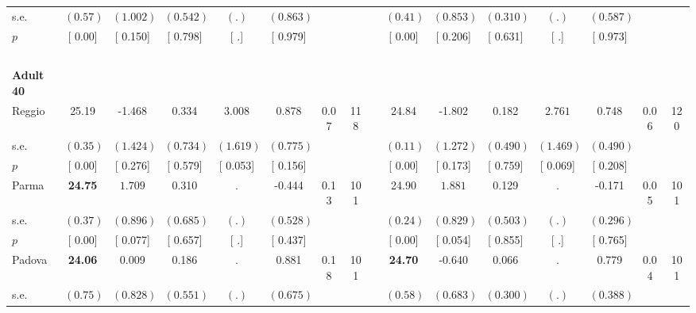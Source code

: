 \begin{longtable}{L{8em} c c c c c c c p{1em} c c c c c c c}
\quad \quad \quad \quad s.e.& $ (     0.57)$ & $ (    1.002)$ & $ (    0.542)$ & $ (        .)$ & $ (    0.863)$ & & & & $ (     0.41)$ & $ (    0.853)$ & $ (    0.310)$ & $ (        .)$ & $ (    0.587)$ & &  \\*
\quad \quad \quad \quad $ p$ & [     0.00] & [    0.150] & [    0.798] & [        .] & [    0.979] & & & & [     0.00] & [    0.206] & [    0.631] & [        .] & [    0.973] & &  \\[1em]
~\\[1em]
\quad \quad \textbf{Adult 40} & & & & & & & & & & & & & & & \\* 
\quad \quad \quad Reggio& 25.19 &    -1.468 &     0.334 & $ \mathbf{    3.008}$ &     0.878 &      0.07 &       118 & & 24.84 &    -1.802 &     0.182 & $ \mathbf{    2.761}$ &     0.748 &      0.06 &       120  \\*
\quad \quad \quad \quad s.e.& $ (     0.35)$ & $ (    1.424)$ & $ (    0.734)$ & $ (    1.619)$ & $ (    0.775)$ & & & & $ (     0.11)$ & $ (    1.272)$ & $ (    0.490)$ & $ (    1.469)$ & $ (    0.490)$ & &  \\*
\quad \quad \quad \quad $ p$ & [     0.00] & [    0.276] & [    0.579] & [    0.053] & [    0.156] & & & & [     0.00] & [    0.173] & [    0.759] & [    0.069] & [    0.208] & &  \\[1em]
\quad \quad \quad Parma& \textbf{    24.75} & $ \mathbf{    1.709}$ &     0.310 &         . &    -0.444 &      0.13 &       101 & & 24.90 & $ \mathbf{    1.881}$ &     0.129 &         . &    -0.171 &      0.05 &       101  \\*
\quad \quad \quad \quad s.e.& $ (     0.37)$ & $ (    0.896)$ & $ (    0.685)$ & $ (        .)$ & $ (    0.528)$ & & & & $ (     0.24)$ & $ (    0.829)$ & $ (    0.503)$ & $ (        .)$ & $ (    0.296)$ & &  \\*
\quad \quad \quad \quad $ p$ & [     0.00] & [    0.077] & [    0.657] & [        .] & [    0.437] & & & & [     0.00] & [    0.054] & [    0.855] & [        .] & [    0.765] & &  \\[1em]
\quad \quad \quad Padova& \textbf{    24.06} &     0.009 &     0.186 &         . &     0.881 &      0.18 &       101 & & \textbf{    24.70} &    -0.640 &     0.066 &         . &     0.779 &      0.04 &       101  \\*
\quad \quad \quad \quad s.e.& $ (     0.75)$ & $ (    0.828)$ & $ (    0.551)$ & $ (        .)$ & $ (    0.675)$ & & & & $ (     0.58)$ & $ (    0.683)$ & $ (    0.300)$ & $ (        .)$ & $ (    0.388)$ & &  \\*

\end{longtable}
